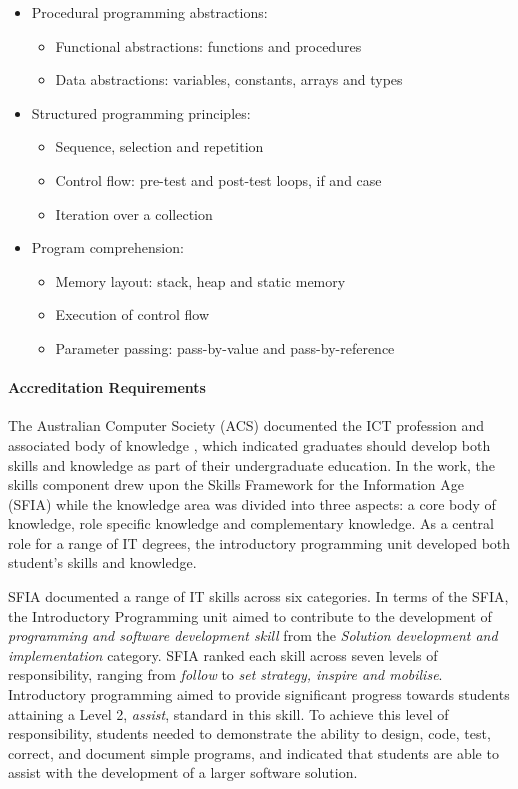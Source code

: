 \begin{itemize}[noitemsep,nolistsep]
	\item Procedural programming abstractions:
	\begin{itemize}[noitemsep,nolistsep]
		\item Functional abstractions: functions and procedures
		\item Data abstractions: variables, constants, arrays and types
	\end{itemize}
	\item Structured programming principles:
	\begin{itemize}[noitemsep,nolistsep]
		\item Sequence, selection and repetition
		\item Control flow: pre-test and post-test loops, if and case
		\item Iteration over a collection
	\end{itemize}
	\item Program comprehension:
	\begin{itemize}[noitemsep,nolistsep]
		\item Memory layout: stack, heap and static memory
		\item Execution of control flow
		\item Parameter passing: pass-by-value and pass-by-reference
	\end{itemize}
\end{itemize}


\paragraph{Accreditation Requirements} %
\label{par:accreditation_requirements}

The Australian Computer Society (ACS) documented the ICT profession and associated body of knowledge \cite{Gregor:2008}, which indicated graduates should develop both skills and knowledge as part of their undergraduate education. In the work, the skills component drew upon the Skills Framework for the Information Age (SFIA) while the knowledge area was divided into three aspects: a core body of knowledge, role specific knowledge and complementary knowledge. As a central role for a range of IT degrees, the introductory programming unit developed both student's skills and knowledge.

SFIA \cite{SFIA:2011} documented a range of IT skills across six categories. In terms of the SFIA, the Introductory Programming unit aimed to contribute to the development of \emph{programming and software development skill} from the \emph{Solution development and implementation} category. SFIA ranked each skill across seven levels of responsibility, ranging from \emph{follow} to \emph{set strategy, inspire and mobilise}. Introductory programming aimed to provide significant progress towards students attaining a Level 2, \emph{assist}, standard in this skill. To achieve this level of responsibility, students needed to demonstrate the ability to design, code, test, correct, and document simple programs, and indicated that students are able to assist with the development of a larger software solution.

